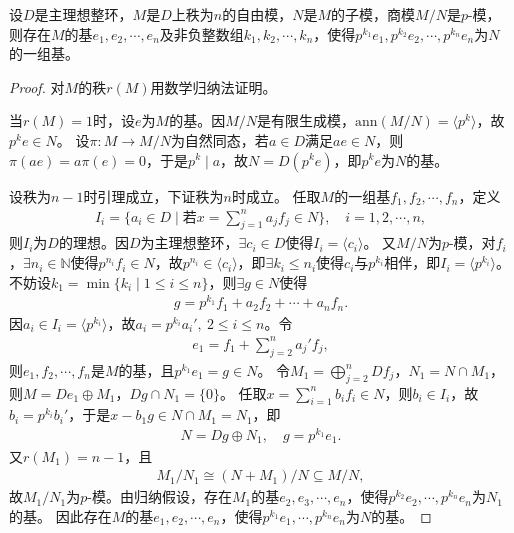 \documentclass[../../main.tex]{subfiles}%
\begin{document}
\begin{lemma}
设$D$是主理想整环，$M$是$D$上秩为$n$的自由模，$N$是$M$的子模，商模$M/N$是$p$-模，则存在$M$的基$e_1,e_2,\cdots,e_n$及非负整数组$k_1,k_2,\cdots,k_n$，使得$p^{k_1}e_1,p^{k_2}e_2,\cdots,p^{k_n}e_n$为$N$的一组基。
\end{lemma}
\begin{proof}
对$M$的秩$r(M)$用数学归纳法证明。

当$r(M)=1$时，设$e$为$M$的基。因$M/N$是有限生成模，$\mathrm{ann}(M/N)=\langle p^k\rangle$，故$p^ke\in N$。
设$\pi:M\to M/N$为自然同态，若$a\in D$满足$ae\in N$，则$\pi(ae)=a\pi(e)=0$，于是$p^k\mid a$，故$N=D(p^ke)$，即$p^ke$为$N$的基。

设秩为$n-1$时引理成立，下证秩为$n$时成立。
任取$M$的一组基$f_1,f_2,\cdots,f_n$，定义
\begin{align*}
I_i=\{a_i\in D\mid \text{若}x=\sum\limits_{j=1}^{n}a_jf_j\in N\},\quad i=1,2,\cdots,n,
\end{align*}
则$I_i$为$D$的理想。因$D$为主理想整环，$\exists c_i\in D$使得$I_i=\langle c_i\rangle$。
又$M/N$为$p$-模，对$f_i$，$\exists n_i\in\mathbb{N}$使得$p^{n_i}f_i\in N$，故$p^{n_i}\in\langle c_i\rangle$，即$\exists k_i\leqslant n_i$使得$c_i$与$p^{k_i}$相伴，即$I_i=\langle p^{k_i}\rangle$。
不妨设$k_1=\min\{k_i\mid 1\leqslant i\leqslant n\}$，则$\exists g\in N$使得
\begin{align*}
g=p^{k_1}f_1+a_2f_2+\cdots+a_nf_n.
\end{align*}
因$a_i\in I_i=\langle p^{k_i}\rangle$，故$a_i=p^{k_i}a_i',\ 2\leqslant i\leqslant n$。令
\begin{align*}
e_1=f_1+\sum\limits_{j=2}^{n}a_j'f_j,
\end{align*}
则$e_1,f_2,\cdots,f_n$是$M$的基，且$p^{k_1}e_1=g\in N$。
令$M_1=\bigoplus\limits_{j=2}^{n}Df_j$，$N_1=N\cap M_1$，则$M=De_1\oplus M_1$，$Dg\cap N_1=\{0\}$。
任取$x=\sum\limits_{i=1}^{n}b_if_i\in N$，则$b_i\in I_i$，故$b_i=p^{k_i}b_i'$，于是$x-b_1g\in N\cap M_1=N_1$，即
\begin{align*}
N=Dg\oplus N_1,\quad g=p^{k_1}e_1.
\end{align*}
又$r(M_1)=n-1$，且
\begin{align*}
M_1/N_1\cong (N+M_1)/N\subseteq M/N,
\end{align*}
故$M_1/N_1$为$p$-模。由归纳假设，存在$M_1$的基$e_2,e_3,\cdots,e_n$，使得$p^{k_2}e_2,\cdots,p^{k_n}e_n$为$N_1$的基。
因此存在$M$的基$e_1,e_2,\cdots,e_n$，使得$p^{k_1}e_1,\cdots,p^{k_n}e_n$为$N$的基。
\end{proof}
\end{document}
